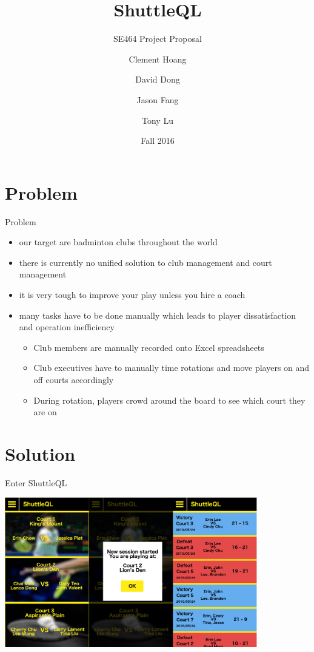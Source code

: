 \documentclass{beamer}
\title{ShuttleQL}
\subtitle{SE464 Project Proposal}
\author{Clement Hoang \and David Dong \and Jason Fang \and Tony Lu}
\institute{University of Waterloo}
\date{Fall 2016}
\begin{document}
\begin{frame}
  \titlepage
\end{frame}

\section{Problem}

\begin{frame}{Problem}
  \begin{itemize}
  \item {
    our target are \alert{badminton clubs} throughout the world
  }
  \item {
    there is currently no unified solution to \alert{club management} and \alert{court management}
  }
  \item {
    it is very tough to \alert{improve} your play unless you hire a coach
  }
  \item {
    many tasks have to be done \alert{manually} which leads to \alert{player dissatisfaction} and \alert{operation inefficiency}
    \begin{itemize}
        \item
          Club members are manually recorded onto Excel spreadsheets
        \item
          Club executives have to manually time rotations and move players on and off courts accordingly
        \item
          During rotation, players crowd around the board to see which court they are on
    \end{itemize}
  }
  \end{itemize}
\end{frame}

\section{Solution}

\begin{frame}{Enter ShuttleQL}

  \includegraphics[width=11cm]{combined}

\end{frame}
\end{document}
